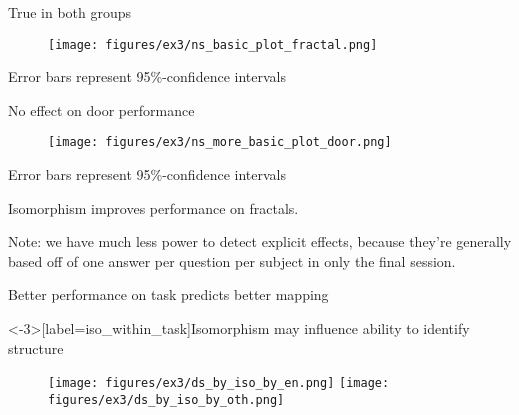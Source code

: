 \documentclass{beamer}
\begin{document}
\begin{frame}{True in both groups}
\begin{figure}
\centering
\texttt{[image: figures/ex3/ns\_basic\_plot\_fractal.png]}
\end{figure}
{\scriptsize Error bars represent 95\%-confidence intervals}
\end{frame}

\begin{frame}{No effect on door performance}
\begin{figure}
\centering
\texttt{[image: figures/ex3/ns\_more\_basic\_plot\_door.png]}
\end{figure}
{\scriptsize Error bars represent 95\%-confidence intervals}
\end{frame}

\begin{frame}[standout]
Isomorphism improves performance on fractals.
\end{frame}


\begin{frame}
Note: we have much less power to detect explicit effects, because they're generally based off of one answer per question per subject in only the final session.
\end{frame}

\begin{frame}{Better performance on task predicts better mapping}
\begin{figure}
\centering
{} 
\end{figure}
\end{frame}


\begin{frame}<-3>[label=iso_within_task]{Isomorphism may influence ability to identify structure}
\begin{figure}
\centering
{}   {
    \texttt{[image: figures/ex3/ds\_by\_iso\_by\_en.png]}
}  {
    \texttt{[image: figures/ex3/ds\_by\_iso\_by\_oth.png]}
}

\end{figure}
\end{frame}
\end{document}
